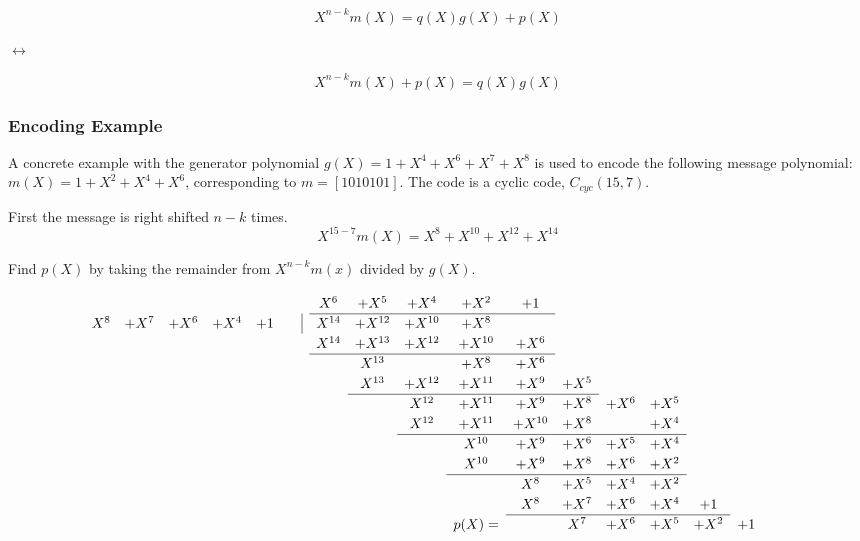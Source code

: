 \documentclass[Main]{subfiles}
\begin{document}
\begin{equation}
X^{n-k}m(X) = q(X)g(X)+p(X)
\end{equation}

$\leftrightarrow$

\begin{equation}
X^{n-k}m(X)+p(X) = q(X)g(X)
\label{eq:encoding}
\end{equation}

\subsubsection{Encoding Example}
\noindent A concrete example with the generator polynomial $g(X)=1+X^4+X^6+X^7+X^8$ is used to encode the following message polynomial:
$m(X)=1+X^2+X^4+X^6$, corresponding to $m=[1010101]$. The code is a cyclic code, $C_{cyc}(15,7)$.

\noindent First the message is right shifted $n-k$ times.
\begin{equation}
X^{15-7}m(X) = X^8+X^{10}+X^{12}+X^{14}
\end{equation}

\noindent Find $p(X)$ by taking the remainder from $X^{n-k}m(x)$ divided by $g(X)$.


\[
\renewcommand\arraystretch{1.2}
\begin{array}{cccccccccccccccccc}
& & & & & X^6 & + X^5 &  +X^4 & +X^2 & +1 & & & & & & & \\
\cline{6-10}
 X^8 & + X^7 & +X^6 & +X^4 & +1 \qquad \vline & X^{14} & +X^{12} & +X^{10} & + X^8 & & & & & & & & \\
& & & & & X^{14} & + X^{13}& + X^{12} & +X^{10} & +X^6 & & & & & & & \\
\cline{6-10}
& & & & & & X^{13} & & +X^8 & +X^6 & & & & & & &\\
&  &&    &&    &  X^{13} & +X^{12} & +X^{11} & +X^9 & +X^5 & \\
\cline{7-11}
& & &&  &&    &  X^{12} & +X^{11} & +X^9 & +X^8 & +X^6 & +X^5  \\
& & &&  &&    &  X^{12} & +X^{11} & +X^{10} & +X^8 & & +X^4  \\
\cline{8-13}
&  &&    &    &   & &  & X^{10} & +X^9 & +X^6 & +X^5 & +X^4 \\
&  &&    &    &   & &  & X^{10} & +X^9 & +X^8 & +X^6 & +X^2 \\
\cline{9-13}
&  &&    &    &   & & & & X^{8} & +X^5 & +X^4 & +X^2 \\
&  &&    &    &   & & & & X^{8} & +X^7 & +X^6 & +X^4 & +1 \\
\cline{10-14}
&  &&  & & & & & p(X) = & & X^{7} & +X^6 & +X^5 & +X^2 & +1 \\
\end{array}
\]
\end{document}
